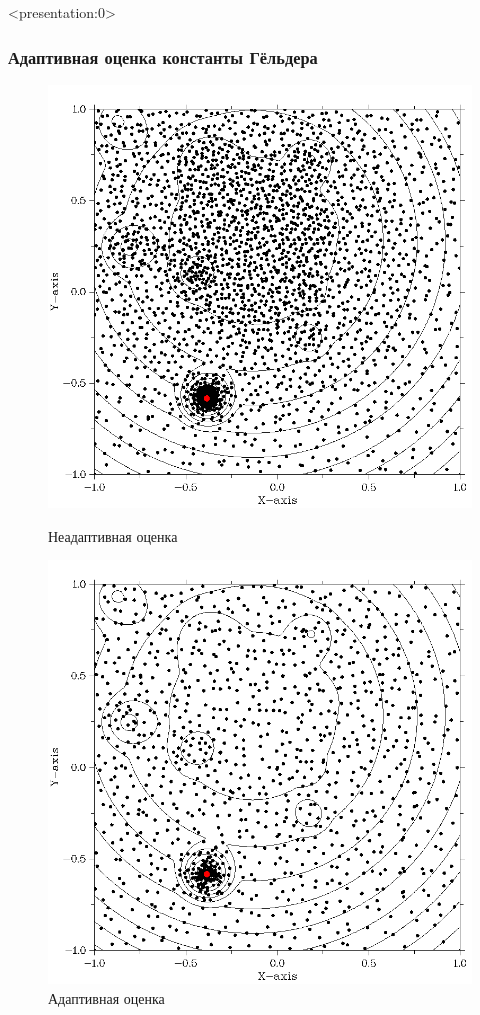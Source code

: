 \documentclass[aspectratio=1610]{beamer}
\begin{document}
\begin{frame}<presentation:0>
\frametitle{Адаптивная оценка константы Гёльдера}
  \begin{figure}[ht]
        \begin{minipage}[b]{0.49\linewidth}
            \centering
            \includegraphics[width=\textwidth]{gkls_glob.png}
            \caption*{Неадаптивная оценка}
        \end{minipage}
        \begin{minipage}[b]{0.49\linewidth}
            \centering
            \includegraphics[width=\textwidth]{gkls_loc.png}
            \caption*{Адаптивная оценка}
        \end{minipage}
  \end{figure}
\end{frame}
\end{document}
